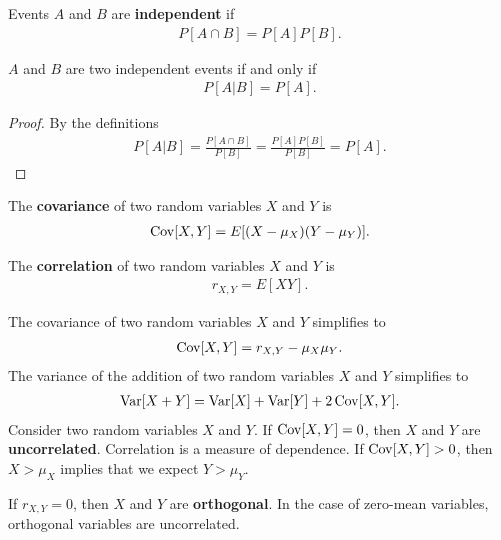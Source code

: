 \documentclass{memoir}
\begin{document}
\begin{definition}
    Events $A$ and $B$ are \textbf{independent} if
    \begin{align*}
        P[A \cap B]=P[A] P[B].
    \end{align*}
\end{definition}

\begin{theorem}
    $A$ and $B$ are two independent events if and only if
    \begin{align*}
        P[A | B] = P[A].
    \end{align*}
\end{theorem}
\begin{proof}
    By the definitions
    \begin{align*}
        P[A | B] = \frac{P[A \cap B]}{P[B]} = \frac{P[A]P[B]}{P[B]} = P[A].
    \end{align*}
\end{proof}

\begin{definition}
    The \textbf{covariance} of two random variables $X$ and $Y$ is
    \begin{align*}
        \operatorname{Cov}[X,Y]=E[(X- \mu_X)(Y- \mu_Y)].
    \end{align*}
\end{definition}

\begin{definition}
    The \textbf{correlation} of two random variables $X$ and $Y$ is
    \begin{align*}
        r_{X,Y} = E[XY].
    \end{align*}
\end{definition}
The covariance of two random variables $X$ and $Y$ simplifies to
\begin{align*}
    \operatorname{Cov}[X,Y] = r_{X,Y} - \mu_X \mu_Y.
\end{align*}
The variance of the addition of two random variables $X$ and $Y$ simplifies to
\begin{align*}
    \operatorname{Var}[X+Y] = \operatorname{Var}[X] + \operatorname{Var}[Y] + 2 \operatorname{Cov}[X,Y].
\end{align*}
Consider two random variables $X$ and $Y$. If $\operatorname{Cov}[X,Y]=0$, then $X$ and $Y$ are \textbf{uncorrelated}. Correlation is a measure of dependence. If $\operatorname{Cov}[X,Y]>0$, then $X>\mu_X$ implies that we expect $Y>\mu_Y$.

If $r_{X,Y}=0$, then $X$ and $Y$ are \textbf{orthogonal}. In the case of zero-mean variables, orthogonal variables are uncorrelated.
\end{document}
